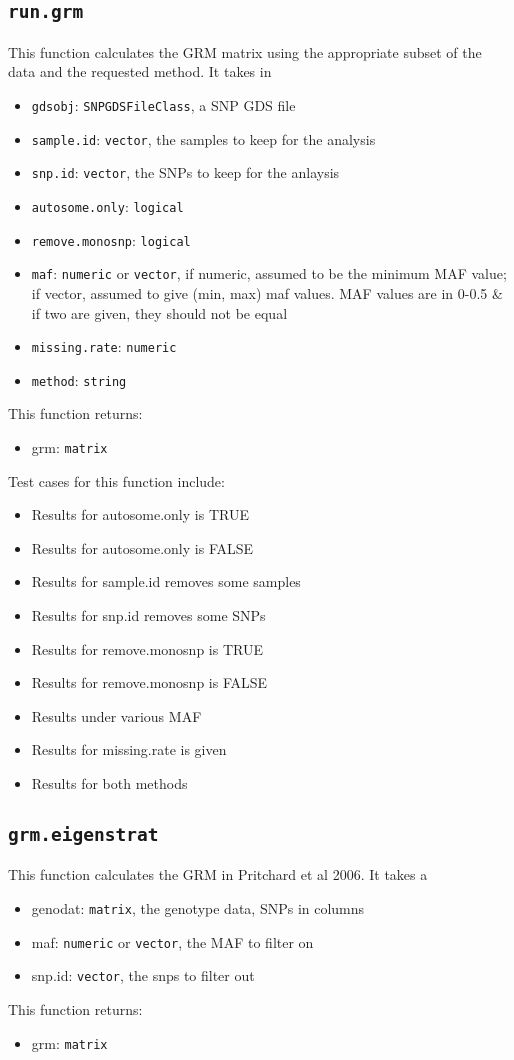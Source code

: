 \documentclass[11pt]{article}
\begin{document}
\subsection{\texttt{run.grm}}
This function calculates the GRM matrix using the appropriate subset of the data and the requested method. It takes in
\begin{itemize}
\item \texttt{gdsobj}: \texttt{SNPGDSFileClass}, a SNP GDS file
\item \texttt{sample.id}: \texttt{vector}, the samples to keep for the analysis
\item \texttt{snp.id}: \texttt{vector}, the SNPs to keep for the anlaysis
\item \texttt{autosome.only}: \texttt{logical}
\item \texttt{remove.monosnp}: \texttt{logical}
\item \texttt{maf}: \texttt{numeric} or \texttt{vector}, if numeric, assumed to be the minimum MAF value; if vector, assumed to give (min, max) maf values. MAF values are in 0-0.5 \& if two are given, they should not be equal
\item \texttt{missing.rate}: \texttt{numeric}
\item \texttt{method}: \texttt{string}
\end{itemize}
This function returns:
\begin{itemize}
	\item grm: \texttt{matrix}
\end{itemize}
Test cases for this function include:
\begin{itemize}
	\item Results for autosome.only is TRUE
	\item Results for autosome.only is FALSE
	\item Results for sample.id removes some samples
	\item Results for snp.id removes some SNPs
	\item Results for remove.monosnp is TRUE
	\item Results for remove.monosnp is FALSE
	\item Results under various MAF
	\item Results for missing.rate is given
	\item Results for both methods
\end{itemize}
\subsection{\texttt{grm.eigenstrat}}
This function calculates the GRM in Pritchard et al 2006. It takes a 
\begin{itemize}
	\item genodat: \texttt{matrix}, the genotype data, SNPs in columns
	\item maf: \texttt{numeric} or \texttt{vector}, the MAF to filter on
	\item snp.id: \texttt{vector}, the snps to filter out
\end{itemize}
This function returns:
\begin{itemize}
	\item grm: \texttt{matrix}
\end{itemize}
\end{document}
